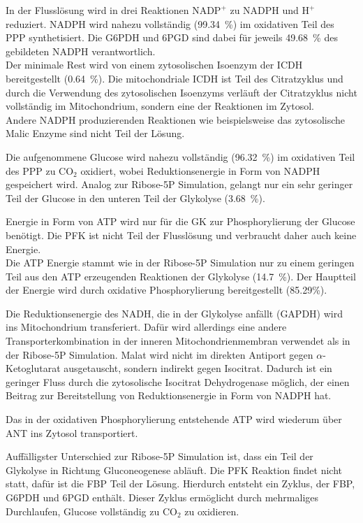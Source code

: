 In der Flusslösung wird in drei Reaktionen $\text{NADP}^+$ zu NADPH und $\text{H}^+$ reduziert.
NADPH wird nahezu vollständig (99.34~\%) im oxidativen Teil des PPP synthetisiert. Die G6PDH und 6PGD sind dabei für jeweils 49.68~\% des gebildeten NADPH verantwortlich.\\
Der minimale Rest wird von einem zytosolischen Isoenzym der ICDH bereitgestellt (0.64~\%). Die mitochondriale ICDH ist Teil des Citratzyklus und durch die Verwendung des zytosolischen Isoenzyms verläuft der Citratzyklus nicht vollständig im Mitochondrium, sondern eine der Reaktionen im Zytosol.\\
Andere NADPH produzierenden Reaktionen wie beispielsweise das zytosolische Malic Enzyme sind nicht Teil der Lösung.

Die aufgenommene Glucose wird nahezu vollständig (96.32~\%) im oxidativen Teil des PPP zu $\text{CO}_2$ oxidiert, wobei Reduktionsenergie in Form von NADPH gespeichert wird. Analog zur Ribose-5P Simulation, gelangt nur ein sehr geringer Teil der Glucose in den unteren Teil der Glykolyse (3.68~\%).

Energie in Form von ATP wird nur für die GK zur Phosphorylierung der Glucose benötigt. Die PFK ist nicht Teil der Flusslösung und verbraucht daher auch keine Energie.\\
Die ATP Energie stammt wie in der Ribose-5P Simulation nur zu einem geringen Teil aus den ATP erzeugenden Reaktionen der Glykolyse (14.7~\%). Der Hauptteil der Energie wird durch oxidative Phosphorylierung bereitgestellt (85.29\%). 

Die Reduktionsenergie des NADH, die in der Glykolyse anfällt (GAPDH) wird ins Mitochondrium transferiert. Dafür wird allerdings eine andere Transporterkombination in der inneren Mitochondrienmembran verwendet als in der Ribose-5P Simulation.
Malat wird nicht im direkten Antiport gegen $\alpha$-Ketoglutarat ausgetauscht, sondern indirekt gegen Isocitrat.
Dadurch ist ein geringer Fluss durch die zytosolische Isocitrat Dehydrogenase möglich, der einen Beitrag zur Bereitstellung von Reduktionsenergie in Form von NADPH hat. 
 
Das in der oxidativen Phosphorylierung entstehende ATP wird wiederum über ANT ins Zytosol transportiert.

Auffälligster Unterschied zur Ribose-5P Simulation ist, dass ein Teil der Glykolyse in Richtung Gluconeogenese abläuft. Die PFK Reaktion findet nicht statt, dafür ist die FBP Teil der Lösung. Hierdurch entsteht ein Zyklus, der FBP, G6PDH und 6PGD enthält. Dieser Zyklus ermöglicht durch mehrmaliges Durchlaufen, Glucose vollständig zu $\text{CO}_2$ zu oxidieren.

